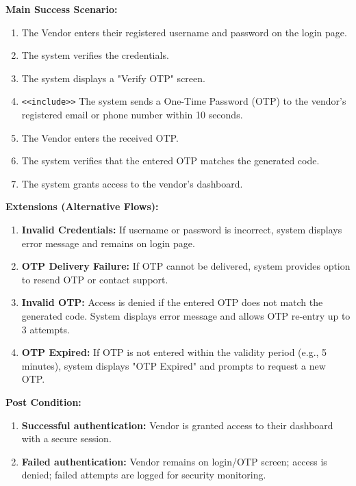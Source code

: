 \textbf{Main Success Scenario:}
\begin{enumerate}
    \item The Vendor enters their registered username and password on the login page.
    
    \item The system verifies the credentials.
    
    \item The system displays a "Verify OTP" screen.
    
    \item \texttt{\textless\textless include\textgreater\textgreater} The system sends a One-Time Password (OTP) to the vendor's registered email or phone number within 10 seconds.
    
    \item The Vendor enters the received OTP.
    
    \item The system verifies that the entered OTP matches the generated code.
    
    \item The system grants access to the vendor's dashboard.
\end{enumerate}

\textbf{Extensions (Alternative Flows):}
\begin{enumerate}
    \item[2a.] \textbf{Invalid Credentials:} If username or password is incorrect, system displays error message and remains on login page.
    
    \item[4a.] \textbf{OTP Delivery Failure:} If OTP cannot be delivered, system provides option to resend OTP or contact support.
    
    \item[6a.] \textbf{Invalid OTP:} Access is denied if the entered OTP does not match the generated code. System displays error message and allows OTP re-entry up to 3 attempts.
    
    \item[6b.] \textbf{OTP Expired:} If OTP is not entered within the validity period (e.g., 5 minutes), system displays "OTP Expired" and prompts to request a new OTP.
\end{enumerate}

\textbf{Post Condition:}
\begin{enumerate}
    \item \textbf{Successful authentication:} Vendor is granted access to their dashboard with a secure session.
    \item \textbf{Failed authentication:} Vendor remains on login/OTP screen; access is denied; failed attempts are logged for security monitoring.
\end{enumerate}


